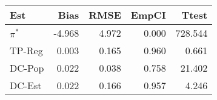 
\begin{tabular}{lrrrr}
\toprule
Est & Bias & RMSE & EmpCI & Ttest\\
\midrule
$\pi^*$ & -4.968 & 4.972 & 0.000 & 728.544\\
TP-Reg & 0.003 & 0.165 & 0.960 & 0.661\\
DC-Pop & 0.022 & 0.038 & 0.758 & 21.402\\
DC-Est & 0.022 & 0.166 & 0.957 & 4.246\\
\bottomrule
\end{tabular}